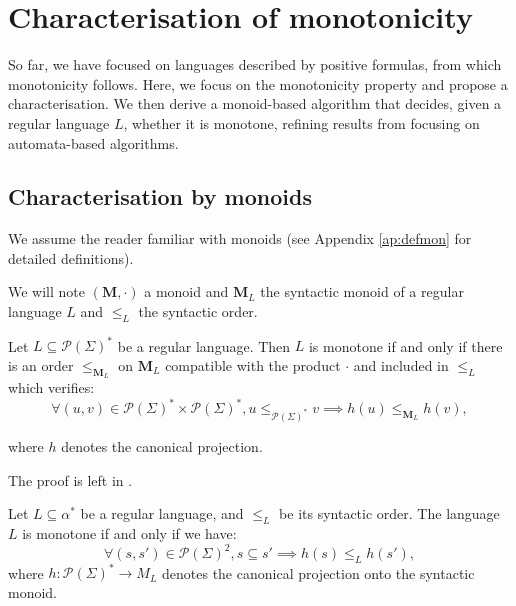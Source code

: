 \documentclass[a4paper,UKenglish,cleveref, autoref, thm-restate]{lipics-v2021}
\renewcommand{\alph}{\part(\Sigma)}
\renewcommand{\part}{\mathcal{P}}
\newcommand{\M}{\mathbf{M}}
\newcommand{\leqml}{\leq_{\mathbf{M}_L}}
\newcommand{\leqa}{\leq_{\alph^*}}
\begin{document}
\section{Characterisation of monotonicity} \label{sec:monoids}



So far, we have focused on languages described by positive formulas, from which monotonicity follows. Here, we focus on the monotonicity property and propose a characterisation. We then derive a monoid-based algorithm that decides, given a regular language $L$, whether it is monotone, refining results from \cite{PFO} focusing on automata-based algorithms.


\subsection{Characterisation by monoids} \label{sec:charac}


We assume the reader familiar with monoids (see Appendix \ref{ap:defmon} for detailed definitions).

We will note $(\M,\cdot)$ a monoid and $\M_L$ the syntactic monoid of a regular language $L$ and $\leq_L$ the syntactic order.












\begin{lemma}\label{ordrmono}
    Let $L\subseteq \alph^*$ be a regular language. Then $L$ is monotone if and only if there is an order $\leqml$ on $\M_L$ compatible with the product $\cdot$ and included in $\leq_L$ which verifies:
    $$
    \forall (u,v) \in \alph^* \times \alph^*, u \leqa v \implies h(u) \leqml h(v),
    $$

    where $h$ denotes the canonical projection.

\end{lemma}



The proof is left in .










\begin{theorem}\label{caracmonot}
    Let $L\subseteq\alpha^*$ be a regular language, and $\leq_L$ be its syntactic order. The language $L$ is monotone if and only if we have:
    $$
    \forall (s,s') \in \alph^2, s \subseteq s' \implies h(s) \leq_L h(s'),
    $$
    where $h:\alph^*\to M_L$ denotes the canonical projection onto the syntactic monoid.
\end{theorem}
\end{document}

